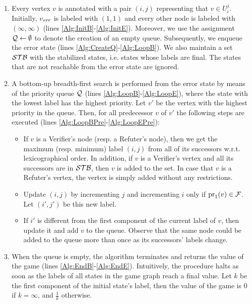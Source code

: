 \begin{enumerate}
  \item Every vertex $v$ is annotated with a pair $(i, j)$ representing that $v \in U_{i}^{j}$. Initially, $v_{\mathit{err}}$ is labeled with $(1, 1)$ and every other   
  node is labeled with $(\infty, \infty)$ (lines \ref{Alg:InitB}-\ref{Alg:InitE}). 
  Moreover, we use the assignment $\mathcal{Q} \gets \emptyset$ to denote the creation of an empty queue. 
  Subsequently, we enqueue the error state (lines \ref{Alg:CreateQ}-\ref{Alg:LoopB}). We also maintain a set $\mathcal{STB}$ with the stabilized  states, i.e. states whose labels are final. The states that are not reachable from the error state are ignored.
  \item A bottom-up breadth-first search is performed from the error state by means of the priority queue $\mathcal{Q}$ (lines \ref{Alg:LoopB}-\ref{Alg:LoopE}), where the state with the lowest label has the highest priority. 
  Let $v'$ be the vertex with the highest priority in the queue. Then, for all predecessor $v$ of $v'$ the following steps 
  are executed (lines \ref{Alg:LoopBPre}-\ref{Alg:LoopEPre}):
  \begin{itemize}
    \item If $v$ is a Verifier's node (resp. a Refuter's node), then we get the 
    maximum (resp. minimum) label $(i,j)$ from all of its successors w.r.t. lexicographical order. In addition, if $v$ is a Verifier's vertex and all its successors are in $\mathcal{STB}$, then $v$ is added to the set. In case that $v$ is a Refuter's vertex, 
    the vertex is simply added without any restrictions. 
    \item Update $(i,j)$ by incrementing $j$ and incrementing $i$ only if $\operatorname{pr}_{1}(v) \in \mathcal{F}$. Let  $(i',j')$ be this new label.
    \item If $i'$ is different from the first component of the current label of $v$, then update it and add $v$ to the queue. 
    Observe that the same node could be added to the queue
     more than once as its successors' labels change.
  \end{itemize}
  \item When the queue is empty, 
  the algorithm terminates and returns the value of the game (lines \ref{Alg:EndB}-\ref{Alg:EndE}). 
  Intuitively, the procedure halts as soon as the labels of all states in the game graph  reach a final value. 
  Let $k$ be the first component of the initial state's label, then the value of the game is $0$ if 
  $k = \infty$, and $\frac{1}{k}$ otherwise.\\
\end{enumerate}
